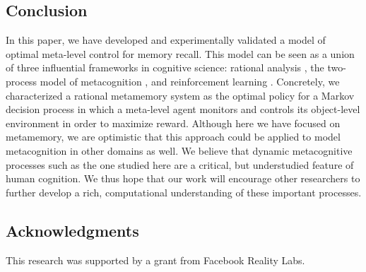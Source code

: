\subsection{Conclusion}

In this paper, we have developed and experimentally validated a model of optimal meta-level control for memory recall. This model can be seen as a union of three influential frameworks in cognitive science: rational analysis \citep{anderson1990adaptive}, the two-process model of metacognition \citepnelson{}, and reinforcement learning \citep{dayan2008decision}. Concretely, we characterized a rational metamemory system as the optimal policy for a Markov decision process in which a meta-level agent monitors and controls its object-level environment in order to maximize reward. Although here we have focused on metamemory, we are optimistic that this approach could be applied to model metacognition in other domains as well. We believe that dynamic metacognitive processes such as the one studied here are a critical, but understudied feature of human cognition. We thus hope that our work will encourage other researchers to further develop a rich, computational understanding of these important processes.


\subsection*{Acknowledgments}
This research was supported by a grant from Facebook Reality Labs.
